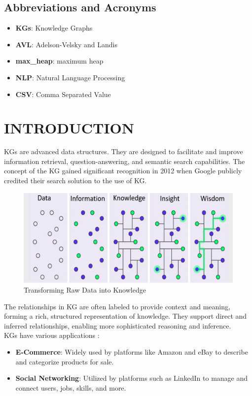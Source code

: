 \documentclass[conference]{IEEEtran}
\begin{document}
\subsection{Abbreviations and Acronyms}\label{AA}

\begin{itemize}
    \item \textbf{KGs}: Knowledge Graphs
    \item \textbf{AVL}: Adelson-Velsky and Landis
    \item \textbf{max\_heap}: maximum heap
    \item \textbf{NLP}: Natural Language Processing
    \item \textbf{CSV}: Comma Separated Value
\end{itemize}


\section{INTRODUCTION}
KGs are advanced data structures. They are designed to facilitate and improve information retrieval, question-answering, and semantic search capabilities.
The concept of the KG gained significant recognition in 2012 when Google \cite{b7} publicly credited their search solution to the use of KG.


\begin{figure}[htbp]
\centering
\includegraphics[width=0.8\linewidth]{intro_dots_image_kg.png}
\caption{Transforming Raw Data\cite{b1} into Knowledge}
\label{fig}
\end{figure}


The relationships in KG are often labeled to provide context and meaning, forming a rich, structured representation of knowledge.
They support direct and inferred relationships, enabling more sophisticated reasoning and inference.
\\KGs have various applications : 
\begin{itemize}
    \item \textbf{E-Commerce}: Widely used by platforms like Amazon\cite{b2, b3} and eBay\cite{b4} to describe and categorize products for sale.
    \item \textbf{Social Networking}: Utilized by platforms such as LinkedIn\cite{b5} to manage and connect users, jobs, skills, and more.
\end{itemize}
\end{document}

